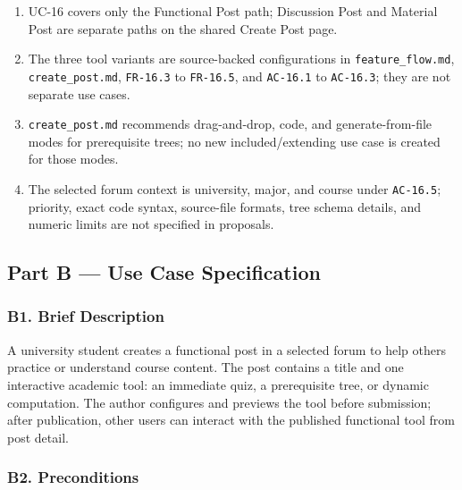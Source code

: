 \documentclass[12pt]{article}
\begin{document}
\begin{enumerate}
\item UC-16 covers only the Functional Post path; Discussion Post and Material Post are separate paths on the shared Create Post page.
\item The three tool variants are source-backed configurations in \texttt{feature\_flow.md}, \texttt{create\_post.md}, \texttt{FR-16.3} to \texttt{FR-16.5}, and \texttt{AC-16.1} to \texttt{AC-16.3}; they are not separate use cases.
\item \texttt{create\_post.md} recommends drag-and-drop, code, and generate-from-file modes for prerequisite trees; no new included/extending use case is created for those modes.
\item The selected forum context is university, major, and course under \texttt{AC-16.5}; priority, exact code syntax, source-file formats, tree schema details, and numeric limits are not specified in proposals.
\end{enumerate}
\par\medskip

\hypertarget{sec:part-b-use-case-specification}{}
\subsection*{Part B --- Use Case Specification}
\par\medskip

\hypertarget{sec:b1-brief-description}{}
\subsubsection*{B1. Brief Description}
\par\medskip

A university student creates a functional post in a selected forum to help others practice or understand course content. The post contains a title and one interactive academic tool: an immediate quiz, a prerequisite tree, or dynamic computation. The author configures and previews the tool before submission; after publication, other users can interact with the published functional tool from post detail.
\par\medskip

\hypertarget{sec:b2-preconditions}{}
\subsubsection*{B2. Preconditions}
\par\medskip
\end{document}
